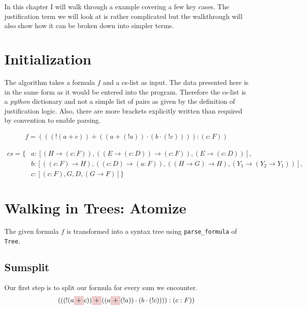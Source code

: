 In this chapter I will walk through a example covering a few key cases. The justification term we will look at is rather complicated but the walkthrough will also show how it can be broken down into simpler terms.

\section{Initialization}
The algorithm takes a formula $f$ and a cs-list as input. The data presented here is in the same form as it would be entered into the program. Therefore the cs-list is a \emph{python} dictionary and not a simple list of pairs as given by the definition of justification logic. Also, there are more brackets explicitly written than required by convention to enable parsing.

\begin{align}\label{eq:f}
f = (((!(a+c))+((a+(!a))\cdot (b\cdot (!c)))):(c:F))
\end{align}

\begin{equation}\label{cs}
\begin{split}
	cs = \{& a: [(H \rightarrow (c:F)), ((E \rightarrow (c:D)) \rightarrow (c:F)), (E \rightarrow (c:D))],\\
	& b: [((c:F) \rightarrow H), ((c:D) \rightarrow (a:F)), ((H \rightarrow G) \rightarrow H), (Y_1 \rightarrow (Y_2 \rightarrow Y_1))],\\
	& c: [(c:F), G, D, (G \rightarrow F)]\}
\end{split}
\end{equation}




\section{Walking in Trees: Atomize}

The given formula $f$ is transformed into a syntax tree using \texttt{parse\_formula} of \texttt{Tree}. 

\subsection{Sumsplit}
Our first step is to split our formula for every sum we encounter.
\begin{equation*}
	(((!(a
    \tikz[baseline]{\node[fill=red!20,anchor=base] (t1){$+$};} c))
    \tikz[baseline]{\node[fill=red!20,anchor=base] (t2){$+$};} ((a
    \tikz[baseline]{\node[fill=red!20,anchor=base] (t3){$+$};} (!a))\cdot (b\cdot (!c)))):(c:F))
\end{equation*}

